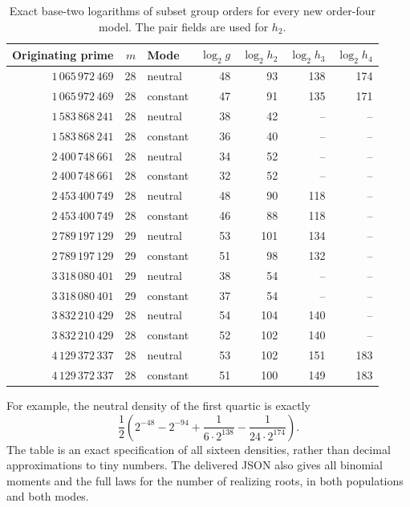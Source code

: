 \documentclass[11pt]{article}
\theoremstyle{definition}\newtheorem{definition}[theorem]{Definition}
\begin{document}
\begin{table}[!htbp]\centering\small\setlength{\tabcolsep}{4pt}
\caption{Exact base-two logarithms of subset group orders for every new order-four model. The pair fields are used for $h_2$.}\label{tab:r4groups}
\begin{tabular}{rrlrrrr}
\toprule
Originating prime & $m$ & Mode & $\log_2g$ & $\log_2h_2$ & $\log_2h_3$ & $\log_2h_4$ \\
\midrule
$1\,065\,972\,469$ & 28 & neutral & 48 & 93 & 138 & 174 \\
$1\,065\,972\,469$ & 28 & constant & 47 & 91 & 135 & 171 \\
$1\,583\,868\,241$ & 28 & neutral & 38 & 42 & -- & -- \\
$1\,583\,868\,241$ & 28 & constant & 36 & 40 & -- & -- \\
$2\,400\,748\,661$ & 28 & neutral & 34 & 52 & -- & -- \\
$2\,400\,748\,661$ & 28 & constant & 32 & 52 & -- & -- \\
$2\,453\,400\,749$ & 28 & neutral & 48 & 90 & 118 & -- \\
$2\,453\,400\,749$ & 28 & constant & 46 & 88 & 118 & -- \\
$2\,789\,197\,129$ & 29 & neutral & 53 & 101 & 134 & -- \\
$2\,789\,197\,129$ & 29 & constant & 51 & 98 & 132 & -- \\
$3\,318\,080\,401$ & 29 & neutral & 38 & 54 & -- & -- \\
$3\,318\,080\,401$ & 29 & constant & 37 & 54 & -- & -- \\
$3\,832\,210\,429$ & 28 & neutral & 54 & 104 & 140 & -- \\
$3\,832\,210\,429$ & 28 & constant & 52 & 102 & 140 & -- \\
$4\,129\,372\,337$ & 28 & neutral & 53 & 102 & 151 & 183 \\
$4\,129\,372\,337$ & 28 & constant & 51 & 100 & 149 & 183 \\
\bottomrule\end{tabular}\end{table}

For example, the neutral density of the first quartic is exactly
\[
 \frac12\left(2^{-48}-2^{-94}
                  +\frac1{6\cdot2^{138}}-\frac1{24\cdot2^{174}}\right).
\]
The table is an exact specification of all sixteen densities, rather
than decimal approximations to tiny numbers. The delivered JSON
also gives all binomial moments and the full laws for the number
of realizing roots, in both populations and both modes.
\end{document}
